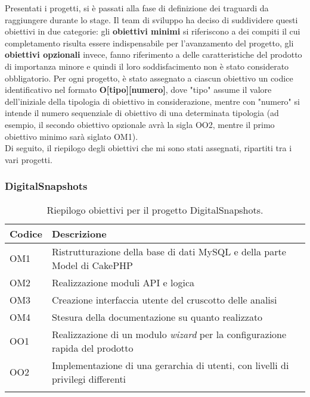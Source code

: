 Presentati i progetti, si è passati alla fase di definizione dei traguardi da raggiungere durante lo stage.
Il team di sviluppo ha deciso di suddividere questi obiettivi in due categorie: gli \textbf{obiettivi minimi} si riferiscono a dei compiti il cui completamento risulta essere indispensabile per l'avanzamento del progetto, gli \textbf{obiettivi opzionali} invece, fanno riferimento a delle caratteristiche del prodotto di importanza minore e quindi il loro soddisfacimento non è stato considerato obbligatorio.
Per ogni progetto, è stato assegnato a ciascun obiettivo un codice identificativo nel formato \textbf{O[tipo][numero]}, dove "tipo" assume il valore dell'iniziale della tipologia di obiettivo in considerazione, mentre con "numero" si intende il numero sequenziale di obiettivo di una determinata tipologia (ad esempio, il secondo obiettivo opzionale avrà la sigla OO2, mentre il primo obiettivo minimo sarà siglato OM1). \\
Di seguito, il riepilogo degli obiettivi che mi sono stati assegnati, ripartiti tra i vari progetti.

\subsubsection*{DigitalSnapshots}
\begin{center}
	\renewcommand{\arraystretch}{1.5}
	\begin{longtable}{ | p{0.1\linewidth} | p{0.9\linewidth} |}	 
		\hline   
	    \rowcolor{header}\textbf{Codice}&\textbf{Descrizione}\\
		\hline    	
    	OM1 & Ristrutturazione della base di dati MySQL e della parte Model di CakePHP \\
    	OM2 & Realizzazione moduli API e logica \\
    	OM3 & Creazione interfaccia utente del cruscotto delle analisi \\
    	OM4 & Stesura della documentazione su quanto realizzato \\
    	OO1 & Realizzazione di un modulo \textit{wizard} per la configurazione rapida del prodotto \\
    	OO2 & Implementazione di una gerarchia di utenti, con livelli di privilegi differenti \\
    	\hline
		\rowcolor{white}    	
    	\caption{Riepilogo obiettivi per il progetto DigitalSnapshots.}
	\end{longtable}
	\label{tab:obiettivi-digitalsnapshots}
\end{center}

